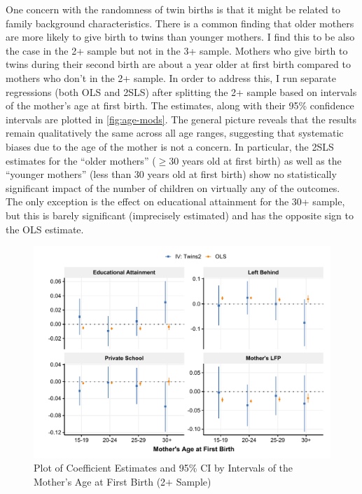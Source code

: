 One concern with the randomness of twin births is that it might be related to family background characteristics. There is a common finding that older mothers are more likely to give birth to twins than younger mothers. I find this to be also the case in the 2+ sample but not in the 3+ sample. Mothers who give birth to twins during their second birth are about a year older at first birth compared to mothers who don't in the 2+ sample. In order to address this, I run separate regressions (both OLS and 2SLS) after splitting the 2+ sample based on intervals of the mother's age at first birth. The estimates, along with their 95\% confidence intervals are plotted in \autoref{fig:age-mods}. The general picture reveals that the results remain qualitatively the same across all age ranges, suggesting that systematic biases due to the age of the mother is not a concern. In particular, the 2SLS estimates for the \enquote{older mothers} ($ \geq 30 $ years old at first birth) as well as the \enquote{younger mothers} (less than 30 years old at first birth) show no statistically significant impact of the number of children on virtually any of the outcomes. The only exception is the effect on educational attainment for the 30+ sample, but this is barely significant (imprecisely estimated) and has the opposite sign to the OLS estimate. 

\begin{figure}[!th]
\centering
\caption{\label{fig:age-mods}Plot of Coefficient Estimates and 95\% CI by Intervals of the Mother's Age at First Birth (2$ + $ Sample)}
\includegraphics[width=\textwidth]{figures/age_mods.pdf}
\end{figure}


